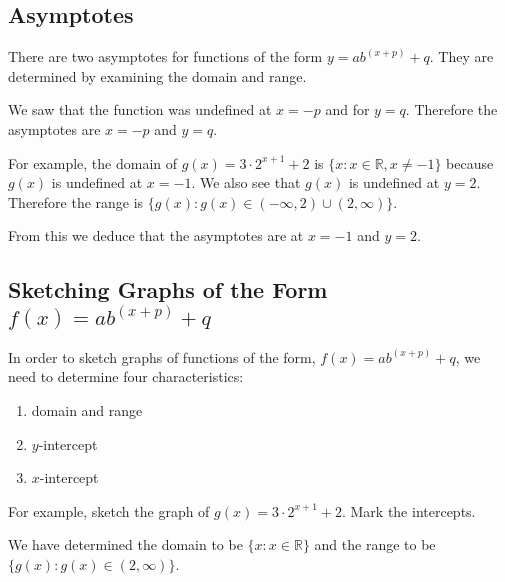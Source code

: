 
\subsection{Asymptotes}
There are two asymptotes for functions of the form $y=ab^{(x+p)} + q$. They are determined by examining the domain and range.

We saw that the function was undefined at $x=-p$ and for $y=q$. Therefore the asymptotes are $x=-p$ and $y=q$.

For example, the domain of $g(x)=3\cdot 2^{x+1} + 2$ is $\{x:x\in\mathbb{R}, x\ne-1\}$ because $g(x)$ is undefined at $x=-1$. We also see that $g(x)$ is undefined at $y=2$. Therefore the range is $\{g(x):g(x)\in(-\infty,2)\cup(2,\infty)\}$.

From this we deduce that the asymptotes are at $x=-1$ and $y=2$.


\subsection{Sketching Graphs of the Form $f(x)=ab^{(x+p)} + q$}
In order to sketch graphs of functions of the form, $f(x)=ab^{(x+p)} + q$, we need to determine four characteristics:
\begin{enumerate}
\item{domain and range}
\item{$y$-intercept}
\item{$x$-intercept}
\end{enumerate}

For example, sketch the graph of $g(x)=3\cdot 2^{x+1} + 2$. Mark the intercepts.

We have determined the domain to be $\{x:x\in\mathbb{R}\}$ and the range to be $\{g(x):g(x)\in(2,\infty)\}$.

